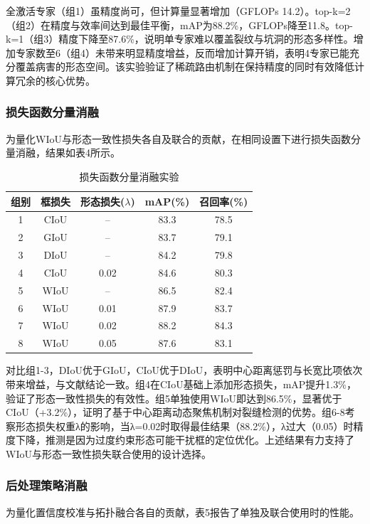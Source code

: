 \documentclass[twocolumn]{sn-jnl}
\begin{document}
	全激活专家（组1）虽精度尚可，但计算量显著增加（GFLOPs 14.2）。top-k=2（组2）在精度与效率间达到最佳平衡，mAP为88.2\%，GFLOPs降至11.8。top-k=1（组3）精度下降至87.6\%，说明单专家难以覆盖裂纹与坑洞的形态多样性。增加专家数至6（组4）未带来明显精度增益，反而增加计算开销，表明4专家已能充分覆盖病害的形态空间。该实验验证了稀疏路由机制在保持精度的同时有效降低计算冗余的核心优势。
	
	\subsubsection{损失函数分量消融}
	为量化WIoU与形态一致性损失各自及联合的贡献，在相同设置下进行损失函数分量消融，结果如表4所示。
	
	\begin{table}[htbp]
		\centering
		\caption{损失函数分量消融实验}
		\begin{tabular}{ccccc}
			\toprule
			组别 & 框损失 & 形态损失($\lambda$) & mAP(\%) & 召回率(\%) \\
			\midrule
			1 & CIoU & -- & 83.3 & 78.5 \\
			2 & GIoU & -- & 83.7 & 79.1 \\
			3 & DIoU & -- & 84.2 & 79.8 \\
			4 & CIoU & 0.02 & 84.6 & 80.3 \\
			5 & WIoU & -- & 86.5 & 82.4 \\
			6 & WIoU & 0.01 & 87.9 & 83.7 \\
			7 & WIoU & 0.02 & 88.2 & 84.3 \\
			8 & WIoU & 0.05 & 87.6 & 83.1 \\
			\bottomrule
		\end{tabular}
		\label{tab:loss}
	\end{table}
	
	对比组1-3，DIoU优于GIoU，CIoU优于DIoU，表明中心距离惩罚与长宽比项依次带来增益，与文献结论一致。组4在CIoU基础上添加形态损失，mAP提升1.3\%，验证了形态一致性损失的有效性。组5单独使用WIoU即达到86.5\%，显著优于CIoU（+3.2\%），证明了基于中心距离动态聚焦机制对裂缝检测的优势。组6-8考察形态损失权重λ的影响，当λ=0.02时取得最佳结果（88.2\%），λ过大（0.05）时精度下降，推测是因为过度约束形态可能干扰框的定位优化。上述结果有力支持了WIoU与形态一致性损失联合使用的设计选择。
	
	\subsubsection{后处理策略消融}
	为量化置信度校准与拓扑融合各自的贡献，表5报告了单独及联合使用时的性能。
	
\end{document}
